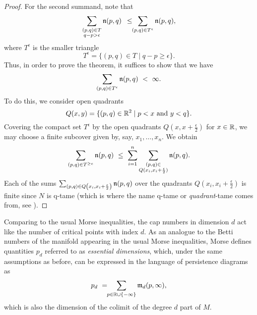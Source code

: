 \begin{proof}
	For the second summand, note that
	\begin{equation*}
	\sum_{ \substack{ (p,q) \in T \\ q-p > \epsilon } } \mathfrak{n} (p,q)
	\ \, \leq \!\!
	\sum_{(p,q) \in T^{\epsilon}} \mathfrak{n} (p,q),
	\end{equation*}
	where $T^{\epsilon}$ is the smaller triangle 
	\begin{equation*}
	T^{\epsilon} = \{(p,q) \in T \mid q-p \geq \epsilon\}.
	\end{equation*}
	Thus, in order to prove the theorem, it suffices to show that we have 
	\begin{equation*}
	\sum_{(p,q) \in T^{\epsilon}} \n (p,q) 
	\ < \ 
	\infty.
	\end{equation*}
	To do this, we consider open quadrants 
	\begin{equation*}
	Q(x, y) = \{ (p, q) \in \mathbb{R}^2 \mid p < x \text{ and } y < q \}.
	\end{equation*}
	Covering the compact set $T^{\epsilon}$ by the open quadrants $Q \left(x, x + \frac{\epsilon}{2} \right)$ for $x \in \mathbb{R}$, we may choose a finite subcover given by, say, $x_1,\dots, x_n$.
	We obtain
	\begin{equation*}
	\sum_{(p,q) \in T^{\geq e}} \mathfrak{n} (p,q) 
	\ \leq \
	\sum_{i=1}^n \sum_{\substack{(p, q) \in \\ Q (x_i, x_i + \frac{\epsilon}{2})}} \mathfrak{n}(p,q).
	\end{equation*}
	Each of the sums $\sum_{(p,q) \in Q \left(x_i, x_i + \frac{\epsilon}{2} \right)} \mathfrak{n}(p,q)$ over the quadrants $Q \left(x_i, x_i + \frac{\epsilon}{2} \right)$ is finite since $N$ is q-tame (which is where the name q-tame or \emph{quadrant}-tame comes from, see \cite[Section 3.8]{Chazal.2016a}).
\end{proof}

Comparing to the usual Morse inequalities, the cap numbers in dimension $d$ act like the number of critical points with index $d$.
As an analogue to the Betti numbers of the manifold appearing in the usual Morse inequalities, Morse defines quantities $p_{d}$ referred to as \emph{essential dimensions}, which, under the same assumptions as before, can be expressed in the language of persistence diagrams as
\begin{equation} \label{e:essential dimension}
p_{d} \ = \!\! \sum_{p \in \mathbb{R} \cup \{-\infty\}} \mathfrak{m}_d(p,\infty),
\end{equation}
which is also the dimension of the colimit of the degree $d$ part of $M$.


